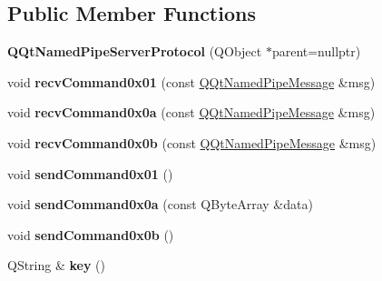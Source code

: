 \subsection*{Public Member Functions}
\begin{DoxyCompactItemize}
\item 
\mbox{\label{class_q_qt_named_pipe_server_protocol_acb3477a54ef7acacb5b134b41b7b16b6}} 
{\bfseries Q\+Qt\+Named\+Pipe\+Server\+Protocol} (Q\+Object $\ast$parent=nullptr)
\item 
\mbox{\label{class_q_qt_named_pipe_server_protocol_a12a726363dac67f9799cf9dcb0f12792}} 
void {\bfseries recv\+Command0x01} (const \mbox{\hyperlink{class_q_qt_named_pipe_message}{Q\+Qt\+Named\+Pipe\+Message}} \&msg)
\item 
\mbox{\label{class_q_qt_named_pipe_server_protocol_a951e75c62e3aa0fbe1373255a2ddcabf}} 
void {\bfseries recv\+Command0x0a} (const \mbox{\hyperlink{class_q_qt_named_pipe_message}{Q\+Qt\+Named\+Pipe\+Message}} \&msg)
\item 
\mbox{\label{class_q_qt_named_pipe_server_protocol_a74ffef94166a84e554bb4553ce5d18a5}} 
void {\bfseries recv\+Command0x0b} (const \mbox{\hyperlink{class_q_qt_named_pipe_message}{Q\+Qt\+Named\+Pipe\+Message}} \&msg)
\item 
\mbox{\label{class_q_qt_named_pipe_server_protocol_ad98fc18b2f76cc7e8ad1b3364ac3f01d}} 
void {\bfseries send\+Command0x01} ()
\item 
\mbox{\label{class_q_qt_named_pipe_server_protocol_ae9ebdd5660d0e52f1f282cb053f9e700}} 
void {\bfseries send\+Command0x0a} (const Q\+Byte\+Array \&data)
\item 
\mbox{\label{class_q_qt_named_pipe_server_protocol_aae0886c69bf3b89c4409c9b92e65094c}} 
void {\bfseries send\+Command0x0b} ()
\item 
\mbox{\label{class_q_qt_named_pipe_server_protocol_a5ba25768e3c974e1f85ac71e5fec6958}} 
Q\+String \& {\bfseries key} ()
\end{DoxyCompactItemize}
